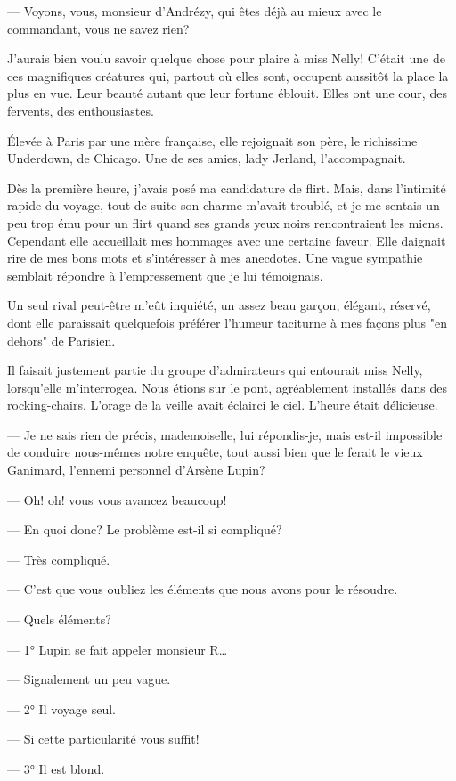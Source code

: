 \documentclass[12pt,a4paper]{article}
\begin{document}
— Voyons, vous, monsieur d’Andrézy, qui êtes déjà au mieux avec le commandant, vous ne savez rien?

J’aurais bien voulu savoir quelque chose pour plaire à miss Nelly! C’était une de ces magnifiques créatures qui, partout où elles sont, occupent aussitôt la place la plus en vue. Leur beauté autant que leur fortune éblouit. Elles ont une cour, des fervents, des enthousiastes.

Élevée à Paris par une mère française, elle rejoignait son père, le richissime Underdown, de Chicago. Une de ses amies, lady Jerland, l’accompagnait.

Dès la première heure, j’avais posé ma candidature de flirt. Mais, dans l’intimité rapide du voyage, tout de suite son charme m’avait troublé, et je me sentais un peu trop ému pour un flirt quand ses grands yeux noirs rencontraient les miens. Cependant elle accueillait mes hommages avec une certaine faveur. Elle daignait rire de mes bons mots et s’intéresser à mes anecdotes. Une vague sympathie semblait répondre à l’empressement que je lui témoignais.

Un seul rival peut-être m’eût inquiété, un assez beau garçon, élégant, réservé, dont elle paraissait quelquefois préférer l’humeur taciturne à mes façons plus "en dehors" de Parisien.

Il faisait justement partie du groupe d’admirateurs qui entourait miss Nelly, lorsqu’elle m’interrogea. Nous étions sur le pont, agréablement installés dans des rocking-chairs. L’orage de la veille avait éclairci le ciel. L’heure était délicieuse.

— Je ne sais rien de précis, mademoiselle, lui répondis-je, mais est-il impossible de conduire nous-mêmes notre enquête, tout aussi bien que le ferait le vieux Ganimard, l’ennemi personnel d’Arsène Lupin?

— Oh! oh! vous vous avancez beaucoup!

— En quoi donc? Le problème est-il si compliqué?

— Très compliqué.

— C’est que vous oubliez les éléments que nous avons pour le résoudre.

— Quels éléments?

— 1° Lupin se fait appeler monsieur R…

— Signalement un peu vague.

— 2° Il voyage seul.

— Si cette particularité vous suffit!

— 3° Il est blond.
\end{document}
